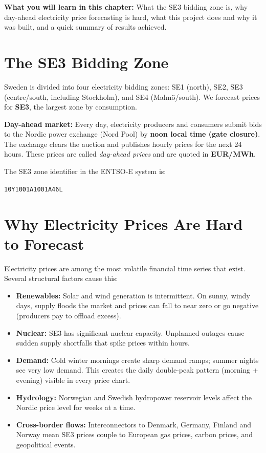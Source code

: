 \documentclass[12pt, a4paper, oneside]{memoir}
\newcommand{\code}[1]{\texttt{\footnotesize #1}}
\begin{document}
\begin{chapterintro}
\sffamily\small\textbf{What you will learn in this chapter:} What the SE3 bidding zone
is, why day-ahead electricity price forecasting is hard, what this project does and why
it was built, and a quick summary of results achieved.
\end{chapterintro}

\section{The SE3 Bidding Zone}

Sweden is divided into four electricity bidding zones: SE1 (north), SE2, SE3 (centre/south,
including Stockholm), and SE4 (Malm\"o/south). We forecast prices for \textbf{SE3}, the
largest zone by consumption.

\begin{keyidea}
\textbf{Day-ahead market:} Every day, electricity producers and consumers submit bids to
the Nordic power exchange (Nord Pool) by \textbf{noon local time (gate closure)}. The
exchange clears the auction and publishes hourly prices for the next 24 hours. These
prices are called \emph{day-ahead prices} and are quoted in \textbf{EUR/MWh}.
\end{keyidea}

The SE3 zone identifier in the ENTSO-E system is:
\begin{center}
\code{10Y1001A1001A46L}
\end{center}

\section{Why Electricity Prices Are Hard to Forecast}

Electricity prices are among the most volatile financial time series that exist.
Several structural factors cause this:

\begin{itemize}
  \item \textbf{Renewables:} Solar and wind generation is intermittent. On sunny, windy days,
    supply floods the market and prices can fall to near zero or go negative
    (producers pay to offload excess).
  \item \textbf{Nuclear:} SE3 has significant nuclear capacity. Unplanned outages cause sudden
    supply shortfalls that spike prices within hours.
  \item \textbf{Demand:} Cold winter mornings create sharp demand ramps; summer nights see
    very low demand. This creates the daily double-peak pattern (morning + evening) visible
    in every price chart.
  \item \textbf{Hydrology:} Norwegian and Swedish hydropower reservoir levels affect the
    Nordic price level for weeks at a time.
  \item \textbf{Cross-border flows:} Interconnectors to Denmark, Germany, Finland and Norway
    mean SE3 prices couple to European gas prices, carbon prices, and geopolitical events.
\end{itemize}
\end{document}
